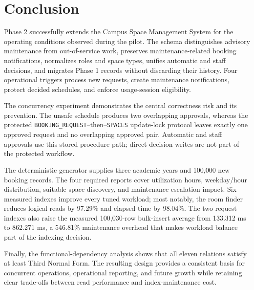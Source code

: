 \section{Conclusion}

Phase 2 successfully extends the Campus Space Management System for the operating conditions observed during the pilot. The schema distinguishes advisory maintenance from out-of-service work, preserves maintenance-related booking notifications, normalizes roles and space types, unifies automatic and staff decisions, and migrates Phase 1 records without discarding their history. Four operational triggers process new requests, create maintenance notifications, protect decided schedules, and enforce usage-session eligibility.

The concurrency experiment demonstrates the central correctness risk and its prevention. The unsafe schedule produces two overlapping approvals, whereas the protected \texttt{BOOKING\_REQUEST}--then--\texttt{SPACES} update-lock protocol leaves exactly one approved request and no overlapping approved pair. Automatic and staff approvals use this stored-procedure path; direct decision writes are not part of the protected workflow.

The deterministic generator supplies three academic years and 100,000 new booking records. The four required reports cover utilization hours, weekday/hour distribution, suitable-space discovery, and maintenance-escalation impact. Six measured indexes improve every tuned workload; most notably, the room finder reduces logical reads by 97.29\% and elapsed time by 98.04\%. The two request indexes also raise the measured 100,030-row bulk-insert average from 133.312 ms to 862.271 ms, a 546.81\% maintenance overhead that makes workload balance part of the indexing decision.

Finally, the functional-dependency analysis shows that all eleven relations satisfy at least Third Normal Form. The resulting design provides a consistent basis for concurrent operations, operational reporting, and future growth while retaining clear trade-offs between read performance and index-maintenance cost.
